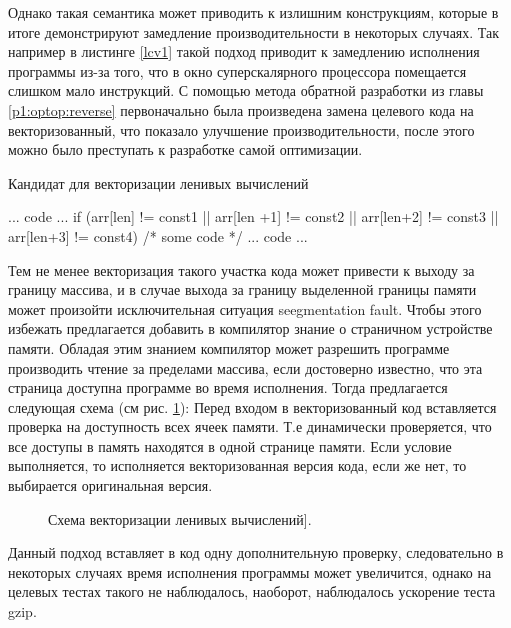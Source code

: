  Однако такая семантика может приводить к излишним конструкциям, которые в итоге демонстрируют замедление производительности в некоторых случаях.
 Так например в листинге \ref{lcv1} такой подход приводит к замедлению исполнения программы из-за того, что в окно суперскалярного процессора помещается слишком мало инструкций. С помощью метода обратной разработки из главы \ref{p1:optop:reverse} первоначально была произведена замена целевого кода на векторизованный, что показало улучшение производительности, после этого можно было преступать к разработке самой оптимизации.
 
 \begin{ListingEnv}[!h]
 	\captiondelim{ } %
 	\caption{Кандидат для векторизации ленивых вычислений}\label{lcv1}
 	
 	\begin{Verb}
... code ...
if (arr[len] != const1 || arr[len +1] != const2 
	|| arr[len+2] != const3  || arr[len+3] != const4) {
		/* some code */
	}
... code ...
 	\end{Verb}
 \end{ListingEnv}
 
 Тем не менее векторизация такого участка кода может привести к выходу за границу массива, и в случае выхода за границу выделенной границы памяти может произойти исключительная ситуация seegmentation fault. Чтобы этого избежать предлагается добавить в компилятор знание о страничном устройстве памяти. Обладая этим знанием компилятор может разрешить программе производить чтение за пределами массива, если достоверно известно, что эта страница доступна  программе во время исполнения. Тогда предлагается следующая схема (см рис. \ref{lcv2}):
Перед входом в векторизованный код вставляется проверка на доступность всех ячеек памяти. Т.е  динамически проверяется, что все доступы в память находятся в одной странице памяти. Если условие выполняется, то исполняется векторизованная версия кода, если же нет, то выбирается оригинальная версия.
 
 \begin{figure}[htbp]
 	\centering
 	
 	\caption{Схема векторизации ленивых вычислений].}
 	\label{lcv2}
 \end{figure}
 
 Данный подход вставляет в код одну дополнительную проверку, следовательно в некоторых случаях время исполнения программы может увеличится, однако на целевых тестах такого не наблюдалось, наоборот, наблюдалось ускорение теста gzip.
